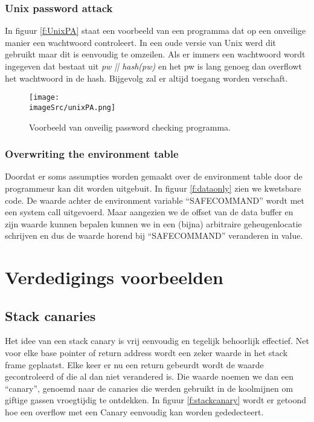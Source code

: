 \documentclass[../main.tex]{subfiles}
\begin{document}
\subsubsection{Unix password attack}
In figuur \ref{f:UnixPA} staat een voorbeeld van een programma dat op een onveilige manier een wachtwoord controleert.
In een oude versie van Unix werd dit gebruikt maar dit is eenvoudig te omzeilen.
Als er immers een wachtwoord wordt ingegeven dat bestaat uit \emph{pw || hash(pw)} en het pw is lang genoeg dan overflowt het wachtwoord in de hash.
Bijgevolg zal er altijd toegang worden verschaft.

\begin{figure}
\centering
\texttt{[image: \\imageSrc/unixPA.png]}
\caption{Voorbeeld van onveilig password checking programma.}
\label{f:unixPA}
\end{figure}

\subsubsection{Overwriting the environment table}
Doordat er soms assumpties worden gemaakt over de environment table door de programmeur kan dit worden uitgebuit.
In figuur \ref{f:dataonly} zien we kwetsbare code.
De waarde achter de environment variable ``SAFECOMMAND'' wordt met een system call uitgevoerd.
Maar aangezien we de offset van de data buffer en zijn waarde kunnen bepalen kunnen we in een (bijna) arbitraire geheugenlocatie schrijven en dus de waarde horend bij ``SAFECOMMAND'' veranderen in value.



\section{Verdedigings voorbeelden}
\subsection{Stack canaries}
Het idee van een stack canary is vrij eenvoudig en tegelijk behoorlijk effectief.
Net voor elke base pointer of return address wordt een zeker waarde in het stack frame geplaatst.
Elke keer er nu een return gebeurdt wordt de waarde gecontroleerd of die al dan niet verandered is.
Die waarde noemen we dan een ``canary'', genoemd naar de canaries die werden gebruikt in de koolmijnen om giftige gassen vroegtijdig te ontdekken.
In figuur \ref{f:stackcanary} wordt er getoond hoe een overflow met een Canary eenvoudig kan worden gededecteert.
\end{document}
